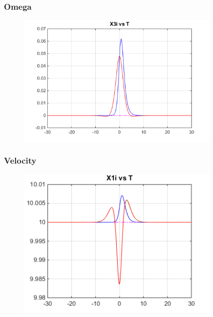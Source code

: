 \documentclass{beamer}
\begin{document}
    \begin{frame}
        \frametitle{Omega}
        \begin{figure}
            \centering
            \includegraphics[width=0.9\textwidth]{omega_it.png}
        \end{figure}
    \end{frame}

    \begin{frame}
        \frametitle{Velocity}
        \begin{figure}
            \centering
            \includegraphics[width=0.9\textwidth]{velocity_it.png}
        \end{figure}
    \end{frame}
    
\end{document}
